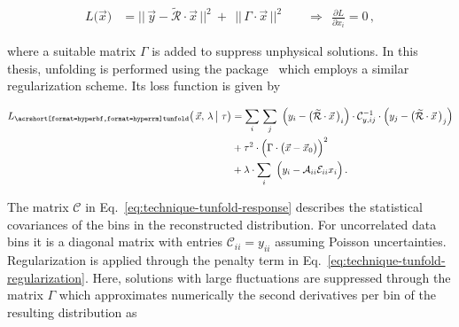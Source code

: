 \begin{align}
L\big(\vec{x}\big)&=\big|\big|\,\vec{y}-\tilde{\mathcal{R}}\cdot\vec{x} \,\big|\big|^{2}~+~~\big|\big|\,\Gamma\cdot\vec{x}\,\big|\big|^{2}\qquad\Rightarrow~~\frac{\partial L}{\partial x_{i}}=0\,,
\end{align}

where a suitable matrix $\Gamma$ is added to suppress unphysical solutions. In this thesis, unfolding is performed using the \TUNFOLD[] package~\cite{1748-0221-7-10-T10003} which employs a similar regularization scheme. Its loss function is given by

\begin{subequations}\label{eq:technique-tunfold}
\begin{align}
L_\mathrm{\TUNFOLD}\big(\,\vec{x},\,\lambda\,\big|~\tau\big)&=\sum_{i}\,\sum_{j}~\Big(y_{i}-\big(\tilde{\mathcal{R}}\cdot\vec{x}\,\big)_{i}\Big)\cdot\mathcal{C}_{y,ij}^{-1}\cdot\Big(y_{j}-\big(\tilde{\mathcal{R}}\cdot\vec{x}\,\big)_{j}\Big)\label{eq:technique-tunfold-response}\\
&+\tau^{2}\cdot\Big(\Gamma\cdot\big(\vec{x}-\vec{x}_{0}\big)\Big)^{2}\label{eq:technique-tunfold-regularization}\\
&+\lambda\cdot\sum_{i}~\Big(y_{i}-\mathcal{A}_{ii}\mathcal{E}_{ii}x_{i}\Big)\,. \label{eq:technique-tunfold-efficiency}
\end{align}
\end{subequations}

The matrix $\mathcal{C}$ in Eq.~\ref{eq:technique-tunfold-response} describes the statistical covariances of the bins in the reconstructed distribution. For uncorrelated data bins it is a diagonal matrix with entries $\mathcal{C}_{ii}=y_{ii}$ assuming Poisson uncertainties. Regularization is applied through the penalty term in Eq.~\ref{eq:technique-tunfold-regularization}. Here, solutions with large fluctuations are suppressed through the matrix $\Gamma$ which approximates numerically the second derivatives per bin of the resulting distribution as 

